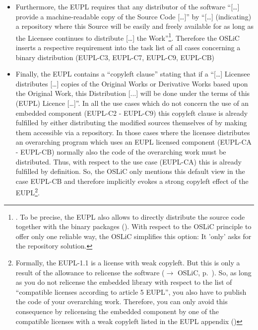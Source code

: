 \begin{itemize}
  \item Furthermore, the EUPL requires that any distributor of the software
  \enquote{[\ldots] provide a machine-readable copy of the Source Code [\ldots]}
  by \enquote{[\ldots] (indicating) a repository where this Source will be
  easily and freely available for as long as the Licensee continues to
  distribute [\ldots] the Work}\footnote{\cite[cf.][\nopage wp.\
  §5]{EuplLicense2007en}. To be precise, the EUPL also allows to directly
  distribute the source code together with the binary packages
  (\cite[cf.][\nopage wp.\ §3]{EuplLicense2007en}). With respect to the OSLiC
  principle to offer only one reliable way, the OSLiC simplifies this option:
  It 'only' asks for the repository solution.}. Therefore the OSLiC inserts a
  respective requirement into the task list of all cases concerning a binary
  distribution  (EUPL-C3, EUPL-C7, EUPL-C9, EUPL-CB)
  
  \item Finally, the EUPL contains a \enquote{copyleft clause} stating that if a
  \enquote{[\ldots] Licensee distributes [\ldots] copies of the Original Works
  or Derivative Works based upon the Original Work, this Distribution [...] will
  be done under the terms of this (EUPL) Licence [\ldots]}. In all the use cases
  which do not concern the use of an embedded component (EUPL-C2 - EUPL-C9) this
  copyleft clause is already fulfilled by either distributing the modified
  sources themselves of by making them accessible via a repository. In those
  cases where the licensee distributes an overarching program which uses an EUPL
  licensed component (EUPL-CA - EUPL-CB) normally also the code of the overarching
  work must be distributed. Thus, with respect to the use case (EUPL-CA) this is
  already fulfilled by definition. So, the OSLiC only mentions this default view
  in the case EUPL-CB and therefore implicitly evokes a strong copyleft effect of
  the EUPL\footnote{Formally, the EUPL-1.1 is a license with weak copyleft. But
  this is only a result of the allowance to relicense the software
  ($\rightarrow$ OSLiC, p.\ \protectionpageref{EUPL}). So, as long as
  you do not relicense the embedded library with respect to the list of
  \enquote{compatible licenses according to article 5 EUPL}, you also have to
  publish the code of your overarching work. Therefore, you can only avoid this
  consequence by relicensing the embedded component by one of the compatible
  licenses with a weak copyleft listed in the EUPL appendix (\cite[cf.][\nopage
  wp §5 and Appendix]{EuplLicense2007en})}.
  

\end{itemize}








%
